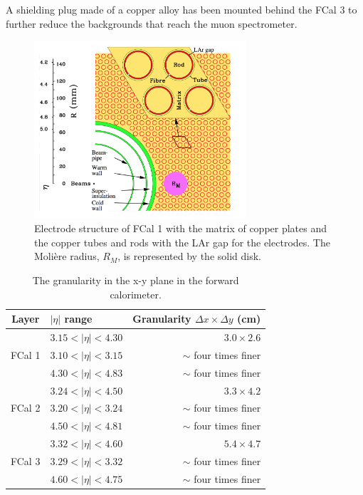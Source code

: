 A shielding plug made of a copper alloy has been mounted behind the FCal 3 to further reduce the backgrounds that reach the muon spectrometer.

\begin{figure}
\centering
\includegraphics[width=0.7\textwidth]{data/photo/detector/forward.png}
\caption{Electrode structure of FCal 1 with the matrix of copper plates and the copper tubes and rods with the LAr gap for the electrodes. The Moli\`ere radius, $R_M$, is represented by the solid disk. \cite{ATLAS_doc}}
\label{fig:forward_calorimeter}
\end{figure}

\begin{table}[htpb]
\centering
\begin{tabular}{|c|l|r|}
\hline
Layer & $|\eta|$ range & Granularity $\Delta x \times \Delta y$ (cm) \\
\hline
\hline
       & $3.15 < |\eta| < 4.30$   & $3.0 \times 2.6$ \\
FCal 1 & $3.10 < |\eta| < 3.15$   & $\sim$ four times finer \\
       & $4.30 < |\eta| < 4.83$   & $\sim$ four times finer \\
\hline
       & $3.24 < |\eta| < 4.50$   & $3.3 \times 4.2$ \\
FCal 2 & $3.20 < |\eta| < 3.24$   & $\sim$ four times finer \\
       & $4.50 < |\eta| < 4.81$   & $\sim$ four times finer \\
\hline
       & $3.32 < |\eta| < 4.60$   & $5.4 \times 4.7$ \\
FCal 3 & $3.29 < |\eta| < 3.32$   & $\sim$ four times finer \\
       & $4.60 < |\eta| < 4.75$   & $\sim$ four times finer \\
\hline
\end{tabular}
\caption{The granularity in the x-y plane in the forward calorimeter. \cite{ATLAS_doc}}
\label{tab:granularity_FCal}
\end{table}

